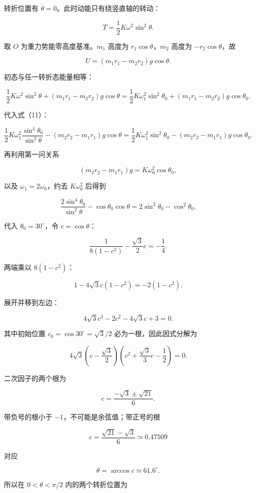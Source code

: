 \documentclass[12pt,a4paper,UTF8]{ctexart}
\begin{document}
转折位置有 \(\dot\theta=0\)。此时动能只有绕竖直轴的转动：

\[
T=\frac12K\omega^2\sin^2\theta. \tag{12}
\]

取 \(O\) 为重力势能零高度基准。\(m_1\) 高度为 \(r_1\cos\theta\)，\(m_2\)
高度为 \(-r_2\cos\theta\)，故

\[
U=(m_1r_1-m_2r_2)g\cos\theta. \tag{13}
\]

初态与任一转折态能量相等：

\[
\frac12K\omega^2\sin^2\theta
+(m_1r_1-m_2r_2)g\cos\theta
=
\frac12K\omega_1^2\sin^2\theta_0
+(m_1r_1-m_2r_2)g\cos\theta_0. \tag{14}
\]

代入式（11）：

\[
\frac12K\omega_1^2
\frac{\sin^4\theta_0}{\sin^2\theta}
-(m_2r_2-m_1r_1)g\cos\theta
=
\frac12K\omega_1^2\sin^2\theta_0
-(m_2r_2-m_1r_1)g\cos\theta_0. \tag{15}
\]

再利用第一问关系

\[
(m_2r_2-m_1r_1)g
=K\omega_0^2\cos\theta_0, \tag{16}
\]

以及 \(\omega_1=2\omega_0\)，约去 \(K\omega_0^2\) 后得到

\[
\frac{2\sin^4\theta_0}{\sin^2\theta}
-\cos\theta_0\cos\theta
=2\sin^2\theta_0-\cos^2\theta_0. \tag{17}
\]

代入 \(\theta_0=30^\circ\)，令 \(c=\cos\theta\)：

\[
\frac{1}{8(1-c^2)}
-\frac{\sqrt3}{2}c
=-\frac14. \tag{18}
\]

两端乘以 \(8(1-c^2)\)：

\[
1-4\sqrt3c(1-c^2)=-2(1-c^2). \tag{19}
\]

展开并移到左边：

\[
4\sqrt3c^3-2c^2-4\sqrt3c+3=0. \tag{20}
\]

其中初始位置 \(c_0=\cos30^\circ=\sqrt3/2\) 必为一根，因此因式分解为

\[
4\sqrt3
\left(c-\frac{\sqrt3}{2}\right)
\left(c^2+\frac{\sqrt3}{3}c-\frac12\right)=0. \tag{21}
\]

二次因子的两个根为

\[
c=\frac{-\sqrt3\pm\sqrt{21}}{6}. \tag{22}
\]

带负号的根小于 \(-1\)，不可能是余弦值；带正号的根

\[
c=\frac{\sqrt{21}-\sqrt3}{6}
\simeq0.47509
\]

对应

\[
\theta=\arccos c\simeq61.6^\circ.
\]

所以在 \(0<\theta<\pi/2\) 内的两个转折位置为
\end{document}
